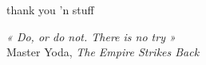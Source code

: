 
\emptypage


thank you 'n stuff

\emptypage


\singlespace
\dominitoc
\renewcommand{\leftmark}{Contents}

\tableofcontents

\emptypage


\onehalfspacing
\setcounter{page}{1}

\begin{center}
\begin{minipage}{0.95\textwidth}
\emph{« Do, or do not. There is no try »}\\
\hspace*{0.4\textwidth} Master Yoda, \emph{The Empire Strikes Back}
\end{minipage}
\end{center}

\vspace*{0.5cm}










\singlespace

